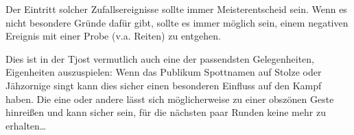 \documentclass[12pt,div=calc,a5paper,parskip=half]{scrartcl}
\begin{document}
Der Eintritt solcher Zufallsereignisse sollte immer Meisterentscheid sein. Wenn es nicht besondere Gründe dafür gibt, sollte es immer möglich sein, einem negativen Ereignis mit einer Probe (v.a. Reiten) zu entgehen. 

Dies ist in der Tjost vermutlich auch eine der passendsten Gelegenheiten, Eigenheiten auszuspielen: Wenn das Publikum Spottnamen auf Stolze oder Jähzornige singt kann dies sicher einen besonderen Einfluss auf den Kampf haben. Die eine oder andere lässt sich möglicherweise zu einer obszönen Geste hinreißen und kann sicher sein, für die nächsten paar Runden keine \gp mehr zu erhalten\dots
\end{document}
